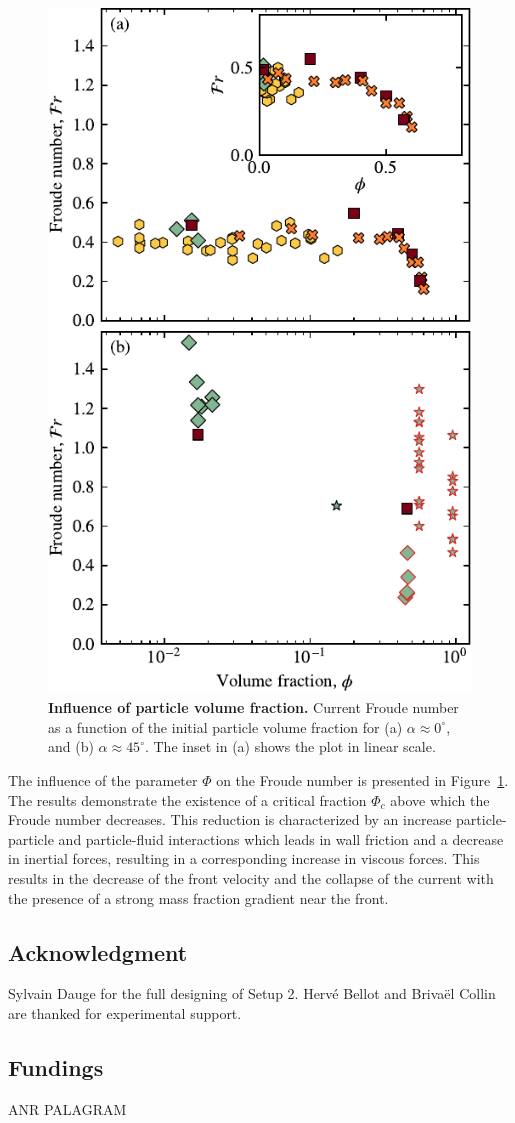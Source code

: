\documentclass[twocolumn]{article}
\begin{document}
\begin{figure}
	\centering
	\includegraphics{figure6.pdf}
	\caption{\textbf{Influence of particle volume fraction.} Current Froude number as a function of the initial particle volume fraction for (a) $\alpha \approx 0^\circ$, and (b) $\alpha \approx 45^\circ$. The inset in (a) shows the plot in linear scale.}
	\label{fig:fig6}
\end{figure}
The influence of the parameter $\Phi$ on the Froude number is presented in Figure~\ref{fig:fig6}. The results demonstrate the existence of a critical fraction $\Phi_{c}$ above which the Froude number decreases. This reduction is characterized by an increase particle-particle and particle-fluid interactions which leads in wall friction and a decrease in inertial forces, resulting in a corresponding increase in viscous forces. This results in the decrease of the front velocity and the collapse of the current with the presence of a strong mass fraction gradient near the front.


\subsection*{Acknowledgment}
Sylvain Dauge for the full designing of Setup 2. Hervé Bellot and Brivaël Collin are thanked for experimental support.

\subsection*{Fundings}
ANR PALAGRAM



\end{document}

